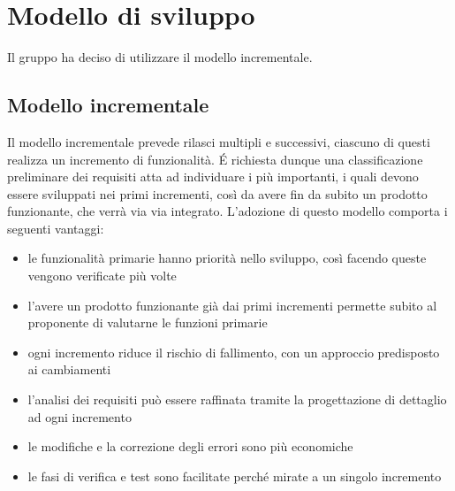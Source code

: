 \section{Modello di sviluppo}
Il gruppo ha deciso di utilizzare il modello incrementale.
\subsection{Modello incrementale}
Il modello incrementale prevede rilasci multipli e successivi, ciascuno di questi realizza un incremento di funzionalità.
É richiesta dunque una classificazione preliminare dei requisiti atta ad individuare i più importanti, i quali devono essere sviluppati nei primi incrementi, così da avere fin da subito un prodotto funzionante, che verrà via via integrato.
L'adozione di questo modello comporta i seguenti vantaggi:
\begin{itemize}
\item le funzionalità primarie hanno priorità nello sviluppo, così facendo queste vengono verificate più volte
\item l'avere un prodotto funzionante già dai primi incrementi permette subito al proponente di valutarne le funzioni primarie
\item ogni incremento riduce il rischio di fallimento, con un approccio predisposto ai cambiamenti
\item l'analisi dei requisiti può essere raffinata tramite la progettazione di dettaglio ad ogni incremento
\item le modifiche e la correzione degli errori sono più economiche
\item le fasi di verifica e test sono facilitate perché mirate a un singolo incremento
\end{itemize}
